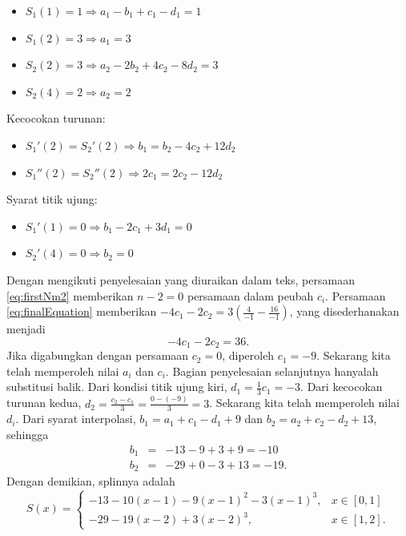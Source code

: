 \begin{description}
\begin{itemize}
\item $S_{1}(1)=1\Rightarrow a_{1}-b_{1}+c_{1}-d_{1}=1$
\item $S_{1}(2)=3\Rightarrow a_{1}=3$
\item $S_{2}(2)=3\Rightarrow a_{2}-2b_{2}+4c_{2}-8d_{2}=3$
\item $S_{2}(4)=2\Rightarrow a_{2}=2$
\end{itemize}
Kecocokan turunan:
\begin{itemize}
\item $S_{1}'(2)=S_{2}'(2)\Rightarrow b_{1}=b_{2}-4c_{2}+12d_{2}$
\item $S_{1}''(2)=S_{2}''(2)\Rightarrow2c_{1}=2c_{2}-12d_{2}$
\end{itemize}
Syarat titik ujung:
\begin{itemize}
\item $S_{1}'(1)=0\Rightarrow b_{1}-2c_{1}+3d_{1}=0$
\item $S_{2}'(4)=0\Rightarrow b_{2}=0$
\end{itemize}
\item [{\ref{exc:cubicSplines-6}:}] Dengan mengikuti penyelesaian yang
diuraikan dalam teks, persamaan \ref{eq:firstNm2} memberikan $n-2=0$
persamaan dalam peubah $c_{i}$. Persamaan \ref{eq:finalEquation}
memberikan $-4c_{1}-2c_{2}=3\left(\frac{4}{-1}-\frac{16}{-1}\right)$,
yang disederhanakan menjadi 
\[
-4c_{1}-2c_{2}=36.
\]
Jika digabungkan dengan persamaan $c_{2}=0$, diperoleh $c_{1}=-9$.
Sekarang kita telah memperoleh nilai $a_{i}$ dan $c_{i}$. Bagian
penyelesaian selanjutnya hanyalah substitusi balik. Dari kondisi titik
ujung kiri, $d_{1}=\frac{1}{3}c_{1}=-3$. Dari kecocokan turunan kedua,
$d_{2}=\frac{c_{2}-c_{1}}{3}=\frac{0-(-9)}{3}=3$. Sekarang kita telah
memperoleh nilai $d_{i}$. Dari syarat interpolasi, $b_{1}=a_{1}+c_{1}-d_{1}+9$
dan $b_{2}=a_{2}+c_{2}-d_{2}+13$, sehingga 
\begin{eqnarray*}
b_{1} & = & -13-9+3+9=-10\\
b_{2} & = & -29+0-3+13=-19.
\end{eqnarray*}
Dengan demikian, splinnya adalah
\[
S(x)=\begin{cases}
-13-10(x-1)-9(x-1)^{2}-3(x-1)^{3}, & x\in[0,1]\\
-29-19(x-2)+3(x-2)^{3}, & x\in[1,2].
\end{cases}
\]


\end{description}

